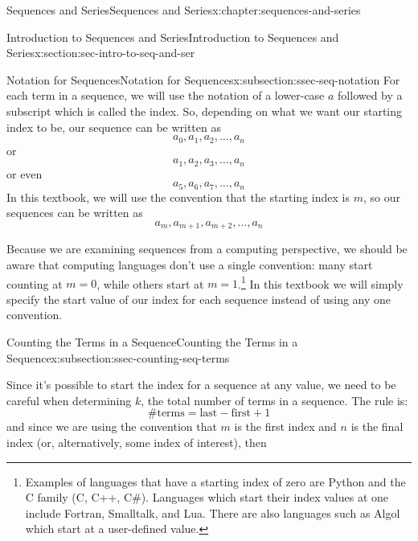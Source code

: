 \documentclass[twoside,10pt,]{book}
\numberwithin{equation}{section}
\begin{document}
\begin{chapterptx}{Sequences and Series}{}{Sequences and Series}{}{}{x:chapter:sequences-and-series}
\begin{sectionptx}{Introduction to Sequences and Series}{}{Introduction to Sequences and Series}{}{}{x:section:sec-intro-to-seq-and-ser}
%
\begin{subsectionptx}{Notation for Sequences}{}{Notation for Sequences}{}{}{x:subsection:ssec-seq-notation}
For each term in a sequence, we will use the notation of a lower-case \(a\) followed by a subscript which is called the index.  So, depending on what we want our starting index to be, our sequence can be written as%
\begin{equation*}
a_0,a_1,a_2,\ldots,a_n
\end{equation*}
or%
\begin{equation*}
a_1,a_2,a_3,\ldots,a_n
\end{equation*}
or even%
\begin{equation*}
a_5,a_6,a_7,\ldots,a_n
\end{equation*}
In this textbook, we will use the convention that the starting index is \(m\), so our sequences can be written as%
\begin{equation*}
a_m, a_{m+1}, a_{m+2}, \ldots, a_n
\end{equation*}
%
\par
Because we are examining sequences from a computing perspective, we should be aware that computing languages don't use a single convention:  many start counting at \(m=0\), while others start at \(m=1\).\footnote{Examples of languages that have a starting index of zero are Python and the C family (C, C++, C\#).  Languages which start their index values at one include Fortran, Smalltalk, and Lua.  There are also languages such as Algol which start at a user-defined value.\label{g:fn:idp229891416}}  In this textbook we will simply specify the start value of our index for each sequence instead of using any one convention.%
\end{subsectionptx}
%
%
\typeout{************************************************}
\typeout{************************************************}
%
\begin{subsectionptx}{Counting the Terms in a Sequence}{}{Counting the Terms in a Sequence}{}{}{x:subsection:ssec-counting-seq-terms}
\begin{introduction}{}%
Since it's possible to start the index for a sequence at any value, we need to be careful when determining \(k\), the total number of terms in a sequence.  The rule is:%
\begin{equation*}
\text{\#terms}=\text{last}-\text{first}+1
\end{equation*}
and since we are using the convention that \(m\) is the first index and \(n\) is the final index (or, alternatively, some index of interest), then%

\end{introduction}
\end{subsectionptx}
\end{sectionptx}
\end{chapterptx}
\end{document}

